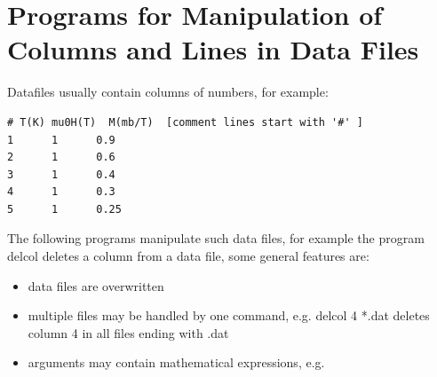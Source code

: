 \section{Programs for Manipulation of Columns and Lines in Data Files}

Datafiles usually contain columns of numbers, for example:

\begin{verbatim}
# T(K) mu0H(T)  M(mb/T)  [comment lines start with '#' ]
1      1      0.9
2      1      0.6
3      1      0.4
4      1      0.3
5      1      0.25
\end{verbatim}

The following programs manipulate such data files, for example
the program {\prg delcol} deletes a column from a data file,
some general features are:
\begin{itemize}
\item data files are overwritten 
\item multiple files may be handled by one command, e.g. {\prg delcol 4 *.dat} deletes column 4
in all 
files ending with .dat
\item arguments may contain mathematical expressions, e.g. 
\end{itemize}

